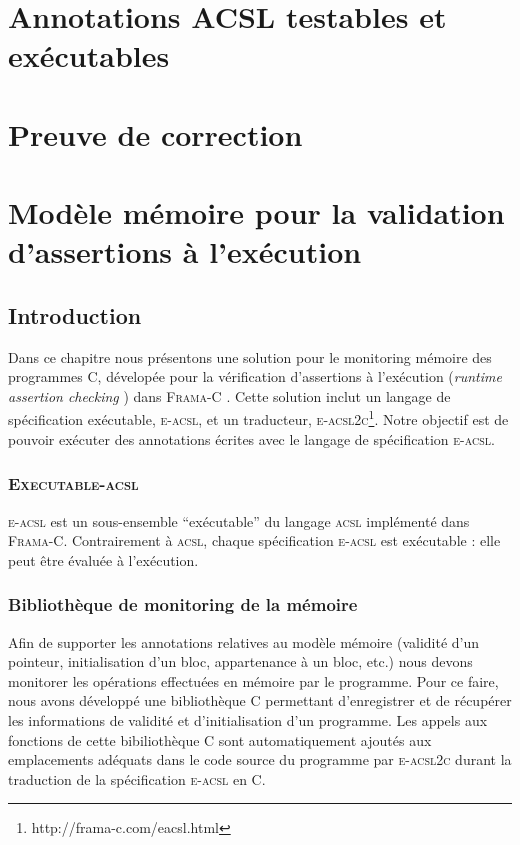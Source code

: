 \documentclass[french]{spimufcphdthesis}
\begin{document}
\chapter{Annotations ACSL testables et exécutables}


\chapter{Preuve de correction}


\chapter{Modèle mémoire pour la validation d'assertions à l'exécution}


\section{Introduction}


Dans ce chapitre nous présentons une solution pour le monitoring mémoire des
programmes C, dévelopée pour la vérification d'assertions à l'exécution
({\em runtime assertion checking} \cite{RAC}) dans \textsc{Frama-C}
\cite{Frama-C}.
Cette solution inclut un langage de spécification exécutable, \textsc{e-acsl},
et un traducteur, \textsc{e-acsl2c}\footnote{http://frama-c.com/eacsl.html}.
Notre objectif est de pouvoir exécuter des annotations écrites avec le langage
de spécification \textsc{e-acsl}.

\subsection{\textsc{Executable-acsl}}

\textsc{e-acsl} est un sous-ensemble ``exécutable'' du langage \textsc{acsl}
implémenté dans \textsc{Frama-C}. Contrairement à \textsc{acsl}, chaque
spécification \textsc{e-acsl} est exécutable : elle peut être évaluée à
l'exécution.

\subsection{Bibliothèque de monitoring de la mémoire}

Afin de supporter les annotations relatives au modèle mémoire (validité d'un
pointeur, initialisation d'un bloc, appartenance à un bloc, etc.) nous devons
monitorer les opérations effectuées en mémoire par le programme. Pour ce faire,
nous avons développé une bibliothèque C permettant d'enregistrer et de récupérer
les informations de validité et d'initialisation d'un programme. Les appels aux
fonctions de cette bibiliothèque C sont automatiquement ajoutés aux emplacements
adéquats dans le code source du programme par \textsc{e-acsl2c} durant la
traduction de la spécification \textsc{e-acsl} en C.
\end{document}
